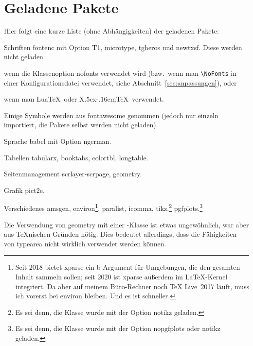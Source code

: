 \documentclass[hyperworksheet]{drcschool}
\newcommand*{\pkg}[1]{\textup{\ttfamily#1}}                                %
\newcommand*{\opt}[1]{\textup{\ttfamily#1}}                                %
\begin{document}
\section{Geladene Pakete}
Hier folgt eine kurze Liste (ohne Abhängigkeiten) der geladenen Pakete:\par\medskip\noindent
\begin{compactdesc}
\item[Schriften] \pkg{fontenc} mit Option \opt{T1}, \pkg{microtype}, \pkg{tgheros} und \pkg{newtxsf}.
   Diese werden nicht geladen
   \begin{compactitem}
   \item wenn die Klassenoption \opt{nofonts} verwendet wird (bzw.~wenn man
   \verb=\NoFonts= in einer Konfigurationsdatei verwendet, siehe
   Abschnitt~\ref{sec:anpassungen}), oder
   \item wenn man Lua\TeX\ oder X\lower.5ex\hbox{}\kern-.16em\TeX\
         verwendet.
   \end{compactitem}
   Einige Symbole werden aus \pkg{fontawesome} genommen
   (jedoch nur einzeln importiert, die Pakete selbst werden nicht geladen).
\item[Sprache] \pkg{babel} mit Option \opt{ngerman}.
\item[Tabellen] \pkg{tabularx}, \pkg{booktabs}, \pkg{colortbl}, \pkg{longtable}.
\item[Seitenmanagement] \pkg{scrlayer-scrpage}, \pkg{geometry}.
\item[Grafik] \pkg{pict2e}.
\item[Verschiedenes] \pkg{amsgen}, \pkg{environ}\footnote{%
   Seit 2018 bietet \pkg{xparse} ein \opt{b}-Argument für Umgebungen, die den gesamten Inhalt
   sammeln sollen; seit 2020 ist \pkg{xparse} außerdem im \LaTeX-Kernel integriert. Da aber
   auf meinem Büro-Rechner noch TeX Live~2017 läuft, muss ich vorerst bei \pkg{environ} bleiben.
   Und es ist schneller.},
   \pkg{paralist}, \pkg{icomma}, \pkg{tikz},\footnote{Es sei denn, die Klasse wurde mit der Option \opt{notikz} geladen.}
   \pkg{pgfplots}.\footnote{Es sei denn, die Klasse wurde mit der Option \opt{nopgfplots} oder \opt{notikz} geladen.}
\end{compactdesc}
Die Verwendung von \pkg{geometry} mit einer \KOMAScript-Klasse ist etwas
ungewöhnlich, war aber aus \TeX nischen Gründen nötig. Dies bedeutet allerdings,
dass die Fähigkeiten von \pkg{typearea} nicht wirklich verwendet werden können.
\end{document}

